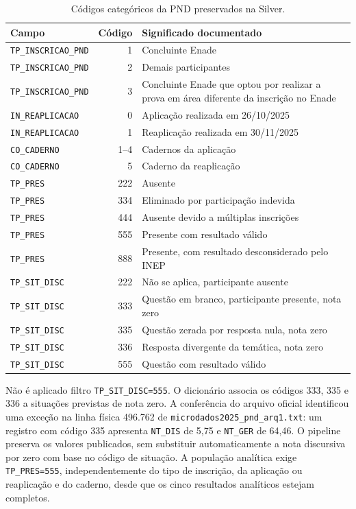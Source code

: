 \begin{table}[H]
\centering
\scriptsize
\caption{Códigos categóricos da PND preservados na Silver.}
\label{tab:ap-codigos-pnd}
\renewcommand{\arraystretch}{1.12}
\begin{tabular}{|p{3.1cm}|r|p{9.4cm}|}
\hline
\textbf{Campo} & \textbf{Código} & \textbf{Significado documentado} \\ \hline
\texttt{TP\_INSCRICAO\_PND} & 1 & Concluinte Enade \\ \hline
\texttt{TP\_INSCRICAO\_PND} & 2 & Demais participantes \\ \hline
\texttt{TP\_INSCRICAO\_PND} & 3 & Concluinte Enade que optou por realizar a prova em área diferente da inscrição no Enade \\ \hline
\texttt{IN\_REAPLICACAO} & 0 & Aplicação realizada em 26/10/2025 \\ \hline
\texttt{IN\_REAPLICACAO} & 1 & Reaplicação realizada em 30/11/2025 \\ \hline
\texttt{CO\_CADERNO} & 1--4 & Cadernos da aplicação \\ \hline
\texttt{CO\_CADERNO} & 5 & Caderno da reaplicação \\ \hline
\texttt{TP\_PRES} & 222 & Ausente \\ \hline
\texttt{TP\_PRES} & 334 & Eliminado por participação indevida \\ \hline
\texttt{TP\_PRES} & 444 & Ausente devido a múltiplas inscrições \\ \hline
\texttt{TP\_PRES} & 555 & Presente com resultado válido \\ \hline
\texttt{TP\_PRES} & 888 & Presente, com resultado desconsiderado pelo INEP \\ \hline
\texttt{TP\_SIT\_DISC} & 222 & Não se aplica, participante ausente \\ \hline
\texttt{TP\_SIT\_DISC} & 333 & Questão em branco, participante presente, nota zero \\ \hline
\texttt{TP\_SIT\_DISC} & 335 & Questão zerada por resposta nula, nota zero \\ \hline
\texttt{TP\_SIT\_DISC} & 336 & Resposta divergente da temática, nota zero \\ \hline
\texttt{TP\_SIT\_DISC} & 555 & Questão com resultado válido \\ \hline
\end{tabular}
\end{table}

Não é aplicado filtro \texttt{TP\_SIT\_DISC=555}. O dicionário associa os códigos 333, 335 e 336 a situações previstas de nota zero. A conferência do arquivo oficial identificou uma exceção na linha física 496.762 de \texttt{microdados2025\_pnd\_arq1.txt}: um registro com código 335 apresenta \texttt{NT\_DIS} de 5,75 e \texttt{NT\_GER} de 64,46. O pipeline preserva os valores publicados, sem substituir automaticamente a nota discursiva por zero com base no código de situação. A população analítica exige \texttt{TP\_PRES=555}, independentemente do tipo de inscrição, da aplicação ou reaplicação e do caderno, desde que os cinco resultados analíticos estejam completos.

